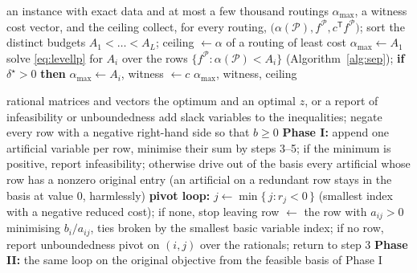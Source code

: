 \documentclass[11pt]{article}
\theoremstyle{remark}
\newcommand{\flow}{f}
\begin{document}
\begin{algorithm}[t]
\caption{Frontier value by enumeration: one separation program per distinct budget level, on the routings strictly below the level.}
\label{alg:frontier}
\begin{algorithmic}[1]
\Require an instance with exact data and at most a few thousand routings
\Ensure $\alpha_{\max}$, a witness cost vector, and the ceiling
\State collect, for every routing, $\bigl(\alpha(\mathcal P),\flow^{\mathcal P},c^{\mathsf T}\flow^{\mathcal P}\bigr)$; sort the distinct budgets $A_1<\dots<A_L$; ceiling $\gets\alpha$ of a routing of least cost
\State $\alpha_{\max}\gets A_1$ 
  \State solve \eqref{eq:levellp} for $A_i$ over the rows $\{\flow^{\mathcal P}\colon\alpha(\mathcal P)<A_i\}$ (Algorithm~\ref{alg:sep}); \textbf{if} $\delta^\star>0$ \textbf{then} $\alpha_{\max}\gets A_i$, witness $\gets c$
\EndFor
\State \Return $\alpha_{\max}$, witness, ceiling
\end{algorithmic}
\end{algorithm}

\begin{algorithm}[t]
\caption{Two-phase simplex in exact rational arithmetic with Bland's rule, for $\min c^{\mathsf T}z$ subject to $A_{\mathrm{ub}}z\le b_{\mathrm{ub}}$, $A_{\mathrm{eq}}z=b_{\mathrm{eq}}$, $z\ge0$.}
\label{alg:bland}
\begin{algorithmic}[1]
\Require rational matrices and vectors
\Ensure the optimum and an optimal $z$, or a report of infeasibility or unboundedness
\State add slack variables to the inequalities; negate every row with a negative right-hand side so that $b\ge0$
\State \textbf{Phase I:} append one artificial variable per row, minimise their sum by steps 3--5; if the minimum is positive, report infeasibility; otherwise drive out of the basis every artificial whose row has a nonzero original entry (an artificial on a redundant row stays in the basis at value $0$, harmlessly)
\State \textbf{pivot loop:} $j\gets\min\{\,j\colon r_j<0\,\}$ (smallest index with a negative reduced cost); if none, stop
\State leaving row $\gets$ the row with $a_{ij}>0$ minimising $b_i/a_{ij}$, ties broken by the smallest basic variable index; if no row, report unboundedness
\State pivot on $(i,j)$ over the rationals; return to step 3
\State \textbf{Phase II:} the same loop on the original objective from the feasible basis of Phase I
\end{algorithmic}
\end{algorithm}
\end{document}
